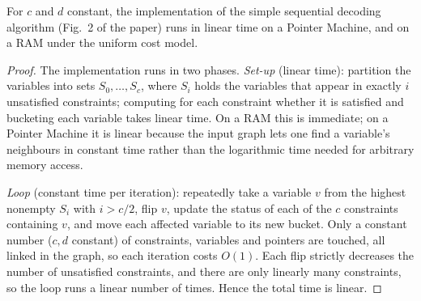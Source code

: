 \begin{lemma}
  \label{lem:seq-linear-time}
  For $c$ and $d$ constant, the implementation of the simple sequential
  decoding algorithm (Fig.~2 of the paper) runs in linear time on a Pointer
  Machine, and on a RAM under the uniform cost model.
\end{lemma}
\begin{proof}
  The implementation runs in two phases. \emph{Set-up} (linear time): partition
  the variables into sets $S_0,\dots,S_c$, where $S_i$ holds the variables that
  appear in exactly $i$ unsatisfied constraints; computing for each constraint
  whether it is satisfied and bucketing each variable takes linear time. On a
  RAM this is immediate; on a Pointer Machine it is linear because the input
  graph lets one find a variable's neighbours in constant time rather than the
  logarithmic time needed for arbitrary memory access.

  \emph{Loop} (constant time per iteration): repeatedly take a variable $v$ from
  the highest nonempty $S_i$ with $i > c/2$, flip $v$, update the status of each
  of the $c$ constraints containing $v$, and move each affected variable to its
  new bucket. Only a constant number ($c,d$ constant) of constraints, variables
  and pointers are touched, all linked in the graph, so each iteration costs
  $O(1)$. Each flip strictly decreases the number of unsatisfied constraints,
  and there are only linearly many constraints, so the loop runs a linear number
  of times. Hence the total time is linear.
\end{proof}

